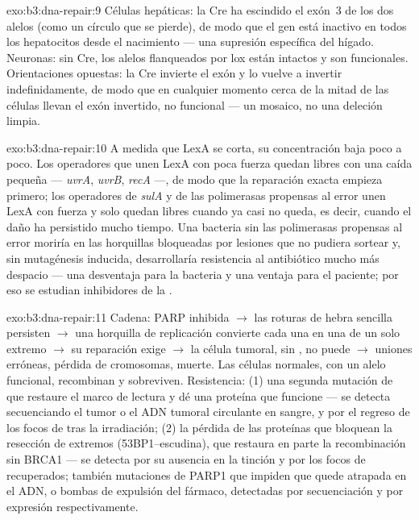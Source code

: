 \begin{solution}{exo:b3:dna-repair:9}
Células hepáticas: la Cre ha escindido el exón~3 de los dos alelos (como
un círculo que se pierde), de modo que el gen está inactivo en todos los
hepatocitos desde el nacimiento --- una supresión específica del hígado.
Neuronas: sin Cre, los alelos flanqueados por lox están intactos y son
funcionales. Orientaciones opuestas: la Cre invierte el exón y lo vuelve
a invertir indefinidamente, de modo que en cualquier momento cerca de la
mitad de las células llevan el exón invertido, no funcional --- un
mosaico, no una deleción limpia.
\end{solution}

\begin{solution}{exo:b3:dna-repair:10}
A medida que LexA se corta, su concentración baja poco a poco. Los
operadores que unen LexA con poca fuerza quedan libres con una caída
pequeña --- \emph{uvrA}, \emph{uvrB}, \emph{recA} ---, de modo que la
reparación exacta empieza primero; los operadores de \emph{sulA} y de las
polimerasas propensas al error unen LexA con fuerza y solo quedan libres
cuando ya casi no queda, es decir, cuando el daño ha persistido mucho
tiempo. Una bacteria sin las polimerasas propensas al error moriría en
las horquillas bloqueadas por lesiones que no pudiera sortear y, sin
mutagénesis inducida, desarrollaría resistencia al antibiótico mucho más
despacio --- una desventaja para la bacteria y una ventaja para el
paciente; por eso se estudian inhibidores de la .
\end{solution}

\begin{solution}{exo:b3:dna-repair:11}
Cadena: PARP inhibida $\to$ las roturas de hebra sencilla persisten
$\to$ una horquilla de replicación convierte cada una en una  de un solo extremo $\to$ su reparación exige  $\to$ la célula tumoral, sin , no puede $\to$ uniones
erróneas, pérdida de cromosomas, muerte. Las células normales, con un
alelo funcional, recombinan y sobreviven. Resistencia: (1) una segunda
mutación de \emph{} que restaure el marco de lectura y dé una
proteína que funcione --- se detecta secuenciando el tumor o el ADN
tumoral circulante en sangre, y por el regreso de los focos de  tras
la irradiación; (2) la pérdida de las proteínas que bloquean la resección
de extremos (53BP1--escudina), que restaura en parte la recombinación sin
BRCA1 --- se detecta por su ausencia en la tinción y por los focos de
 recuperados; también mutaciones de PARP1 que impiden que quede
atrapada en el ADN, o bombas de expulsión del fármaco, detectadas por
secuenciación y por expresión respectivamente.
\end{solution}

